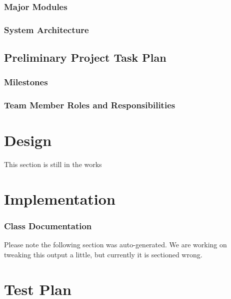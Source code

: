 \documentclass{report}
\begin{document}
\subsection{Major Modules}

\subsection{System Architecture}


\section{Preliminary Project Task Plan}


\subsection{Milestones}

\subsection{Team Member Roles and Responsibilities}



\chapter*{Design}

This section is still in the works

\chapter*{Implementation}

\subsection{Class Documentation}

Please note the following section was auto-generated. We are working on tweaking this output a little, but currently it is sectioned wrong.

%
%
%
%
%
%
%
%
%
%

\chapter*{Test Plan}
\end{document}
